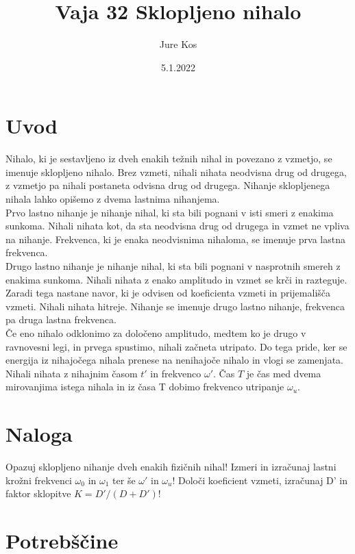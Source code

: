 \documentclass[a4paper]{report}
\title{Vaja 32 Sklopljeno nihalo}
\author {Jure Kos}
\date {5.1.2022}
\begin{document}
\maketitle

\chapter*{Uvod}

Nihalo, ki je sestavljeno iz dveh enakih težnih nihal in povezano z vzmetjo, se imenuje sklopljeno nihalo. 
Brez vzmeti, nihali nihata neodvisna drug od drugega, z vzmetjo pa
nihali postaneta odvisna drug od drugega. Nihanje sklopljenega nihala lahko opišemo z dvema lastnima nihanjema.\\
Prvo lastno nihanje je nihanje nihal, ki sta bili pognani v isti smeri z enakima sunkoma. Nihali nihata kot, da sta neodvisna drug od drugega in vzmet ne vpliva na nihanje.
Frekvenca, ki je enaka neodvisnima nihaloma, se imenuje prva lastna frekvenca.\\
Drugo lastno nihanje je nihanje nihal, ki sta bili pognani v nasprotnih smereh z enakima sunkoma. Nihali nihata z enako amplitudo in vzmet se krči in razteguje. Zaradi tega
nastane navor, ki je odvisen od koeficienta vzmeti in prijemališča vzmeti. Nihali nihata hitreje. Nihanje se imenuje drugo lastno nihanje, frekvenca pa druga lastna frekvenca. \\
Če eno nihalo odklonimo za določeno amplitudo, medtem ko je drugo v ravnovesni legi, in prvega spustimo, nihali začneta utripato. Do tega pride, ker se energija iz nihajočega nihala
prenese na nenihajoče nihalo in vlogi se zamenjata. Nihali nihata z nihajnim časom $t'$ in frekvenco $\omega'$. Čas $T$ je čas med dvema mirovanjima istega nihala in iz časa T dobimo
frekvenco utripanje $\omega_{u}$.

\chapter*{Naloga}

Opazuj sklopljeno nihanje dveh enakih fizičnih nihal! Izmeri in izračunaj lastni krožni frekvenci $\omega_0$ in $\omega_1$ ter še $\omega'$ in $\omega_u$! Določi koeficient vzmeti, izračunaj D' in faktor sklopitve $K = D' / (D + D')$!

\begingroup

\let\clearpage\relax

\chapter*{Potrebščine}
\end{document}
